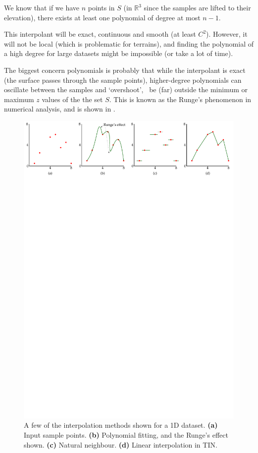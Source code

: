 We know that if we have $n$ points in $S$ (in $\mathbb{R}^3$ since the samples are lifted to their elevation), there exists at least one polynomial of degree at most $n-1$.

This interpolant will be exact, continuous and smooth (at least $C^2$).
However, it will not be local (which is problematic for terrains), and finding the polynomial of a high degree for large datasets might be impossible (or take a lot of time).

The biggest concern polynomials is probably that while the interpolant is exact (the surface passes through the sample points), higher-degree polynomials can oscillate between the samples and `overshoot', \ie\ be (far) outside the minimum or maximum $z$ values of the the set $S$.
This is known as the Runge's phenomenon in numerical analysis,%
and is shown in .
\begin{figure}
  \centering
  \includegraphics[width=\linewidth]{figs/polynomial}
  \caption{A few of the interpolation methods shown for a 1D dataset. \textbf{(a)} Input sample points. \textbf{(b)} Polynomial fitting, and the Runge's effect shown. \textbf{(c)} Natural neighbour. \textbf{(d)} Linear interpolation in TIN.}%
\end{figure}



